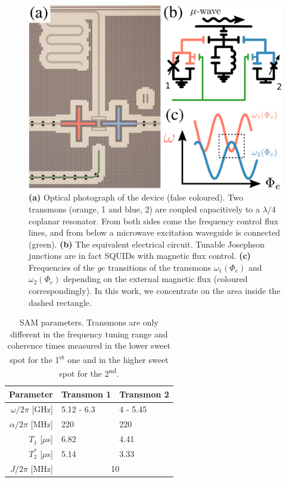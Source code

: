 \documentclass[%
 aip,
 amsmath,amssymb,
 reprint,%
]{revtex4-1}
\begin{document}
\begin{figure}
	\includegraphics[width=\linewidth]{experiment_2}
	\caption{\textbf{(a)} Optical photograph of the device (false coloured). Two transmons (orange, 1 and blue, 2) are coupled capacitively to a $\lambda/4$ coplanar resonator. From both sides come the frequency control flux lines, and from below a microwave excitation waveguide is connected (green). \textbf{(b)} The equivalent electrical circuit. Tunable Josephson junctions are in fact SQUIDs with magnetic flux control. \textbf{(c)} Frequencies of the $ge$ transitions of the transmons $\omega_1(\Phi_e)$ and $\omega_2(\Phi_e)$ depending on the external magnetic flux (coloured correspondingly). In this work, we concentrate on the area inside the dashed rectangle.}
	\label{fig:experiment}
\end{figure}


\begin{table}
	\begin{ruledtabular}
	\begin{tabular}{rll}
	Parameter & Transmon 1  & Transmon 2\\\hline
	$\omega/2\pi$ [GHz] & 5.12 - 6.3  & 4 - 5.45\\
	$\alpha/2\pi$ [MHz] & 220 & 220 \\
	$T_1$ [$\mu$s]  & 6.82 &  4.41 \\
	$T_2^*$ [$\mu$s]  & 5.14  &  3.33\\\hline
	$J/2\pi$ [MHz] &\multicolumn{2}{c}{10} 
	\end{tabular}
	\end{ruledtabular}
	\caption{SAM parameters. Transmons are only different in the frequency tuning range and coherence times measured in the lower sweet spot for the 1\textsuperscript{st} one and in the higher sweet spot for the 2\textsuperscript{nd}.}
\end{table}
\end{document}

